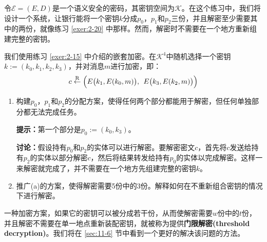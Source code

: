 \begin{exercise}[简单的门限解密]\label{exer:2-21}
令$\mathcal{E}=(E,D)$是一个语义安全的密码，其密钥空间为$\mathcal{K}$。在这个练习中，我们将设计一个系统，让银行能将一个密钥$k$分成$p_0$，$p_1$和$p_2$三份，并且解密至少需要其中的两份，就像练习 \ref{exer:2-20} 中那样。然而，解密时不需要在一个地方重新组建完整的密钥。

我们使用练习 \ref{exer:2-15} 中介绍的嵌套加密。在$\mathcal{K}^4$中随机选择一个密钥$k:=(k_0,k_1,k_2,k_3)$，并对消息$m$进行加密，即：
\[
c\overset{\rm R}\leftarrow\Big( E\big(k_1,E(k_0,m)\big),\;\,E\big(k_3,E(k_2,m)\big)\Big)
\]
\begin{enumerate}[\indent(a)]
	\item 构建$p_0$，$p_1$和$p_2$的分配方案，使得任何两个部分都能用于解密，但任何单独部分都无法完成任务。

	\vspace{1pt}

	\textbf{提示：}第一个部分是$p_0:=(k_0,k_3)$。
	
	\vspace{1pt}

	\textbf{讨论：}假设持有$p_0$和$p_2$的实体可以进行解密。要解密密文$c$，首先将$c$发送给持有$p_2$的实体以部分解密$c$，然后将结果转发给持有$p_0$的实体以完成解密。这样一来解密就完成了，并不需要在一个地方先组建完整的密钥$k$。
	\item 推广(a)的方案，使得解密需要5份中的3份。解释如何在不重新组合密钥的情况下进行解密。
\end{enumerate}
一种加密方案，如果它的密钥可以被分成若干份，从而使解密需要$w$份中的$t$份，并且解密不需要在单一地点重新装配密钥，就被称为提供\textbf{门限解密(threshold decryption)}。我们将在 \ref{sec:11-6} 节中看到一个更好的解决该问题的方法。
\end{exercise}

